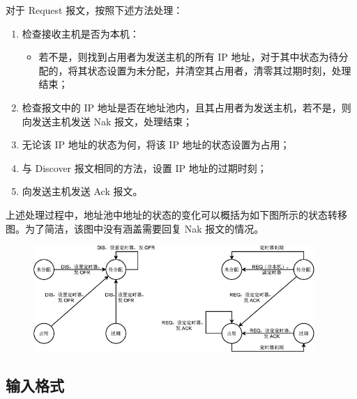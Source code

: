 对于 Request 报文，按照下述方法处理：

\begin{enumerate}

\item 检查接收主机是否为本机：\begin{itemize}

\item 若不是，则找到占用者为发送主机的所有 IP 地址，对于其中状态为待分配的，将其状态设置为未分配，并清空其占用者，清零其过期时刻，处理结束；

\end{itemize}



\item 检查报文中的 IP 地址是否在地址池内，且其占用者为发送主机，若不是，则向发送主机发送 Nak 报文，处理结束；

\item 无论该 IP 地址的状态为何，将该 IP 地址的状态设置为占用；

\item 与 Discover 报文相同的方法，设置 IP 地址的过期时刻；

\item 向发送主机发送 Ack 报文。

\end{enumerate}

上述处理过程中，地址池中地址的状态的变化可以概括为如下图所示的状态转移图。为了简洁，该图中没有涵盖需要回复 Nak 报文的情况。

\begin{figure}[H]
    \centering
    \includegraphics[width=0.95\textwidth]{image/22/3-p-1.jpg}
\end{figure}


\subsection*{输入格式}

